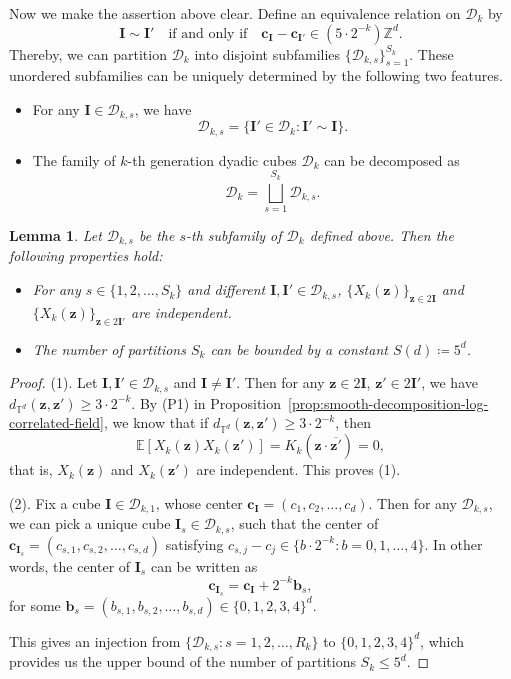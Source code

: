 \documentclass[12pt]{amsart}
\newtheorem{lemma}[theorem]{Lemma}
\theoremstyle{definition}
\theoremstyle{remark}
\newcommand{\bz}{\boldsymbol{z}}
\newcommand{\Z}{\mathbb{Z}}
\newcommand{\E}{\mathbb{E}}
\newcommand{\T}{\mathbb{T}}
\numberwithin{equation}{section}
\begin{document}
Now we make the assertion above clear. Define an equivalence relation on $\mathscr{D}_k$ by
\[
\boldsymbol{I}\sim \boldsymbol{I}'\quad \text{if and only if}\quad \boldsymbol{c}_{\boldsymbol{I}}-\boldsymbol{c}_{\boldsymbol{I}'}\in (5\cdot 2^{-k})\Z^d.
\]
Thereby, we can partition $\mathscr{D}_k$ into disjoint subfamilies $\{\mathscr{D}_{k,s}\}_{s=1}^{S_k}$. These unordered subfamilies can be uniquely determined by the following two features.
\begin{itemize}
	\item[(1)] For any $\boldsymbol{I}\in \mathscr{D}_{k,s}$, we have
	\[
	\mathscr{D}_{k,s}=\{\boldsymbol{I}'\in \mathscr{D}_k:\boldsymbol{I}'\sim \boldsymbol{I}\}.
	\]
	\item[(2)] The family of $k$-th generation dyadic cubes $\mathscr{D}_k$ can be decomposed as
	\[
	\mathscr{D}_k=\bigsqcup_{s=1}^{S_k}\mathscr{D}_{k,s}.
	\]
\end{itemize}
\begin{lemma} Let $\mathscr{D}_{k,s}$ be the $s$-th subfamily of $\mathscr{D}_k$ defined above. Then the following properties hold:
\begin{itemize}
    \item[(1)]  For any $s\in \{1,2,\ldots,S_k\}$ and different $\boldsymbol{I},\boldsymbol{I}'\in \mathscr{D}_{k,s}$, $\{X_k(\bz)\}_{\bz\in 2\boldsymbol{I}}$ and $\{X_k(\bz)\}_{\bz\in 2\boldsymbol{I}'}$ are independent. 
    \item[(2)]  The number of partitions $S_k$ can be bounded by a constant $S(d)\coloneq 5^d$.
\end{itemize}
\end{lemma}
\begin{proof}
(1). Let $\boldsymbol{I},\boldsymbol{I}'\in \mathscr{D}_{k,s}$ and $\boldsymbol{I}\ne \boldsymbol{I}'$. Then for any $\bz\in 2\boldsymbol{I}$, $\bz'\in 2\boldsymbol{I}'$, we have $d_{\T^d}(\bz,\bz')\ge 3\cdot 2^{-k}$.
By (P1) in Proposition~\ref{prop:smooth-decomposition-log-correlated-field}, we know that if $d_{\T^d}(\bz,\bz')\ge 3\cdot 2^{-k}$, then 
\[
\E[X_k(\bz)X_k(\bz')]=K_k(\bz\cdot \overline{\bz'})=0,
\]
that is, $X_k(\bz)$ and $X_k(\bz')$ are independent. This proves (1). 

(2). Fix a cube $\boldsymbol{I}\in \mathscr{D}_{k,1}$, whose center $\boldsymbol{c}_{\boldsymbol{I}}=(c_1,c_2,\ldots,c_d)$. Then for any $\mathscr{D}_{k,s}$, we can pick a unique cube $\boldsymbol{I}_s\in \mathscr{D}_{k,s}$, such that the center of $\boldsymbol{c}_{\boldsymbol{I}_s}=(c_{s,1},c_{s,2},\ldots,c_{s,d})$ satisfying $c_{s,j}-c_{j}\in \{b\cdot 2^{-k}:b=0,1,\ldots,4\}$. 
In other words, the center of $\boldsymbol{I}_s$ can be written as
\[
\boldsymbol{c}_{\boldsymbol{I}_s}=\boldsymbol{c}_{\boldsymbol{I}}+2^{-k}\boldsymbol{b}_s,
\]
for some $\boldsymbol{b}_s=(b_{s,1},b_{s,2},\ldots,b_{s,d})\in \{0,1,2,3,4\}^d$. 

This gives an injection from $\{\mathscr{D}_{k,s}:s=1,2,\ldots,R_k\}$ to $\{0,1,2,3,4\}^d$, which provides us the upper bound of the number of partitions $S_k\le 5^d$.
\end{proof}
\end{document}

